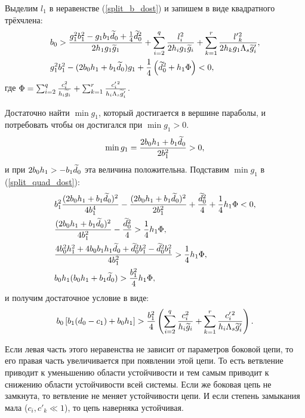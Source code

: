 Выделим \(l_1\) в неравенстве (\ref{split_b_dost}) и запишем в виде квадратного трёхчлена:
\begin{align} \label{split_quad_dost}
    \begin{split}
        &b_0 > \frac{g_1^2 b_1^2 - g_1 b_1 \widetilde{d}_0 + \frac{1}{4} \widetilde{d}_0^2 }{2h_1 g_1 \widetilde{g}_1} + \sum_{i=2}^{q} \frac{l^2_i}{2h_i g_1 \widetilde{g}_i} + \sum_{k=1}^{r} \frac{l'{}^2_k}{2h_k g_1 \Lambda_s \widetilde{g}'_i}, \\
        &g_1^2 b_1^2 - (2b_0 h_1 + b_1 \widetilde{d}_0) g_1 + \frac{1}{4} \left(\widetilde{d}_0^2 + h_1 \Phi \right) < 0,
    \end{split}
\end{align}
где \( \Phi = \sum_{i=2}^{q} \frac{c_i^2}{h_i \widetilde{g}_i} + \sum_{k=1}^{r} \frac{c'_i{}^2}{h_i \Lambda_s \widetilde{g}'_i} \).

Достаточно найти \(\min g_1\), который достигается в вершине параболы, и потребовать чтобы он достигался при \(\min g_1 > 0\).
\begin{equation}
    \min g_1 = \frac{2b_0 h_1 + b_1 \widetilde{d}_0}{2 b_1^2} > 0,
\end{equation}
и при \(2b_0 h_1 > - b_1 \widetilde{d}_0\) эта величина положительна. Подставим \(\min g_1\) в (\ref{split_quad_dost}):
\begin{equation*}
    \begin{split}
        & b_1^2 \frac{(2b_0 h_1 + b_1 \widetilde{d}_0)^2}{4 b_1^4} - \frac{(2b_0 h_1 + b_1 \widetilde{d}_0)^2}{2 b_1^2} + \frac{\widetilde{d}_0^2}{4} + \frac{1}{4} h_1 \Phi < 0, \\
        & \frac{(2b_0 h_1 + b_1 \widetilde{d}_0)^2}{4 b_1^2} - \frac{\widetilde{d}_0^2}{4} > \frac{1}{4} h_1 \Phi, \\
        & \frac{4 b_0^2 h_1^2 + 4 b_0 b_1 h_1 \widetilde{d}_0 + \widetilde{d}_0^2 b_1^2 - \widetilde{d}_0^2 b_1^2}{4 b_1^2} > \frac{1}{4} h_1 \Phi, \\
        & b_0 h_1 (b_0 h_1 + b_1 \widetilde{d}_0) > \frac{b_1^2}{4} h_1 \Phi,
    \end{split}
\end{equation*}
и получим достаточное условие в виде:
\begin{equation} \label{split_h_dost}
    b_0 \left[ b_1 (d_0 - c_1) + b_0 h_1 \right] > \frac{b_1^2}{4} \left( \sum_{i=2}^{q} \frac{c_i^2}{h_i \widetilde{g}_i} + \sum_{k=1}^{r} \frac{c'_i{}^2}{h_i \Lambda_s \widetilde{g}'_i} \right).
\end{equation}

Если левая часть этого неравенства не зависит от параметров боковой цепи, то его правая часть увеличивается при появлении этой цепи. То есть ветвление приводит к уменьшению области устойчивости и тем самым приводит к снижению области устойчивости всей системы. Если же боковая цепь не замкнута, то ветвление не меняет устойчивости цепи. И если степень замыкания мала (\(c_i, c'_k \ll 1\)), то цепь наверняка устойчивая.

